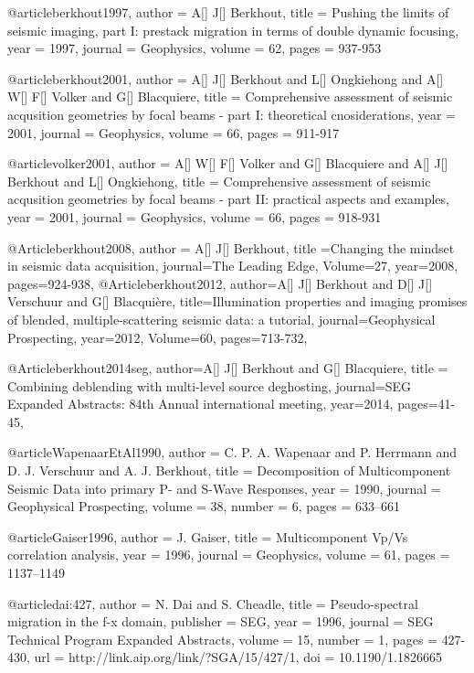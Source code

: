 @article{berkhout1997,
  author =	 {A[] J[] Berkhout},
  title =	 {Pushing the limits of seismic imaging, part I: prestack migration in terms of double dynamic focusing},
  year =	 1997,
  journal =	 {Geophysics},
  volume =	 62,
  pages =	 {937-953}
}

@article{berkhout2001,
  author =	 {A[] J[] Berkhout and L[] Ongkiehong and A[] W[] F[] Volker and G[] Blacquiere},
  title =	 {Comprehensive assessment of seismic acqusition geometries by focal beams - part {I}: theoretical cnosiderations},
  year =	 2001,
  journal =	 {Geophysics},
  volume =	 66,
  pages =	 {911-917}
}

@article{volker2001,
  author =	 {A[] W[] F[] Volker and G[] Blacquiere and A[] J[] Berkhout and L[] Ongkiehong},
  title =	 {Comprehensive assessment of seismic acqusition geometries by focal beams - part {II}: practical aspects and examples},
  year =	 2001,
  journal =	 {Geophysics},
  volume =	 66,
  pages =	 {918-931}
}

@Article{berkhout2008,
  author = {A[] J[] Berkhout},
  title ={Changing the mindset in seismic data acquisition},
  journal={The Leading Edge},
  Volume=27,
  year=2008,
  pages={924-938},
}
@Article{berkhout2012,
  author={A[] J[] Berkhout and D[] J[] Verschuur and G[] Blacqui\`{e}re},
  title={Illumination properties and imaging promises of blended, multiple-scattering seismic data: a tutorial},
  journal={Geophysical Prospecting},
  year=2012,
  Volume=60,
  pages={713-732},
}


@Article{berkhout2014seg,
  author={A[] J[] Berkhout and G[] Blacquiere},
  title = {Combining deblending with multi-level source deghosting},
  journal={SEG Expanded Abstracts: 84th Annual international meeting},
  year=2014,
  pages={41-45},
}

@article{WapenaarEtAl1990,
  author =	 {C. P. A. Wapenaar and P. Herrmann and
                  D. J. Verschuur and A. J. Berkhout},
  title =	 {Decomposition of Multicomponent Seismic Data into
                  primary {P}- and {S}-Wave Responses},
  year =	 1990,
  journal =	 {Geophysical Prospecting},
  volume =	 38,
  number =	 6,
  pages =	 {633--661}
}



@article{Gaiser1996,
  author =	 {J. Gaiser},
  title =	 {Multicomponent {V}p/{V}s correlation analysis},
  year =	 1996,
  journal =	 {Geophysics},
  volume =	 61,
  pages =	 {1137--1149}
}

@article{dai:427,
  author =	 {N. Dai and S. Cheadle},
  title =	 {Pseudo-spectral migration in the f-x domain},
  publisher =	 {SEG},
  year =	 1996,
  journal =	 {SEG Technical Program Expanded Abstracts},
  volume =	 15,
  number =	 1,
  pages =	 {427-430},
  url =		 {http://link.aip.org/link/?SGA/15/427/1},
  doi =		 {10.1190/1.1826665}
}

